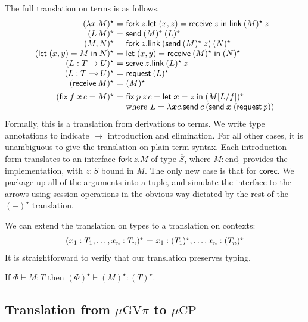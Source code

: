 \documentclass[orivec,envcountsame]{llncs}
\makeatletter
\newcommand{\gvdual}[1]{\overline{#1}}
\newcommand{\lto}{\ensuremath{\multimap}}
\newcommand{\uto}{\ensuremath{\rightarrow}}
\newcommand{\outterm}{\mathrm{end}_!}
\newcommand{\gvtyp}[3]{#1 \vdash #2 : #3}
\newcommand{\mkwd}[1]{\mathsf{#1}}
\newcommand{\gvsend}[2]{\mkwd{send}\:#1\:#2}
\newcommand{\gvreceive}[1]{\mkwd{receive}\:#1}
\newcommand{\gvlet}[3]{\mkwd{let}\;#1 = #2\;\mkwd{in}\;#3}
\newcommand{\gvlink}[2]{\mkwd{link}\:#1\:#2}
\newcommand{\gvfork}[2]{\mkwd{fork}\:#1.#2}
\newcommand{\lrkwd}{\mkwd{fix}}
\newcommand{\gvfix}[3]{\lrkwd\:#1\:#2 = #3}
\newcommand{\gvserve}[2]{\mkwd{serve}\:#1.#2}
\newcommand{\gvrequest}[1]{\mkwd{request}\:#1}
\newcommand{\key}{\mkwd}
\newcommand{\topi}[1]{({#1})^\star}
\newcommand{\mucp}{$\mu\mathrm{CP}$\xspace}
\newcommand{\gvpi}{$\mu\mathrm{GV}\pi$\xspace}
\newcommand{\ba}{\begin{array}}
\newcommand{\ea}{\end{array}}
\newenvironment{equations}{\[\ba{@{}r@{~}c@{~}l@{}}}{\ea\]}
\makeatother
\begin{document}
The full translation on terms is as follows.
\begin{equations}
\topi{\lambda x.M} &=& \gvfork{z}{\gvlet{(x, z)}{\gvreceive{z}}{\gvlink{\topi{M}}{z}}} \\
\topi{L\,M} &=& \gvsend{\topi{M}}{\topi{L}} \\
\topi{M, N} &=&
  \gvfork{z}
    {\gvlink{(\gvsend{\topi{M}}{z})}{\topi{N}}} \\
\topi{\gvlet{(x, y)}{M}{N}} &=&
    \gvlet{(x, y)}{\gvreceive{\topi{M}}}{\topi{N}} \\
\topi{L : T \uto U} &=&
  \gvserve{z}{\gvlink{\topi{L}}{z}} \\
\topi{L : T \lto U} &=& \gvrequest{\topi{L}} \\
\topi{\gvreceive{M}} &=& \topi{M}
\\[1ex]
\topi{\gvfix{f}{\vec{x}\,c}{M}} &=&
  \gvfix{p}{z\,c}{\gvlet{\vec{x}}{z}{\topi{M[L/f]}}} \\
&& \text{where }L = \lambda \vec{x} c.\gvsend{c}{(\gvsend{\vec{x}}{(\gvrequest{p})})} \\
\end{equations}%
Formally, this is a translation from derivations to terms. We write type annotations to indicate
$\to$ introduction and elimination. For all other cases, it is unambiguous to give the translation
on plain term syntax. Each introduction form translates to an interface $\gvfork{z}{M}$ of type
$\gvdual{S}$, where $M : \outterm$ provides the implementation, with $z : S$ bound in $M$.
%
The only new case is that for $\key{corec}$. We package up all of the arguments into a tuple, and
simulate the interface to the arrows using session operations in the obvious way dictated by the
rest of the $\topi{-}$ translation.

We can extend the translation on types to a translation on contexts:
\begin{equations}
\topi{x_1:T_1, \dots, x_n:T_n} &=& x_1:\topi{T_1}, \dots, x_n:\topi{T_n} \\
\end{equations}%
It is straightforward to verify that our translation preserves typing.
\begin{theorem}
If $\gvtyp{\Phi}{M}{T}$ then $\gvtyp{\topi{\Phi}}{\topi{M}}{\topi{T}}$.
\end{theorem}

\subsection{Translation from \gvpi to \mucp}\label{sec:gvpitocp}
\end{document}

